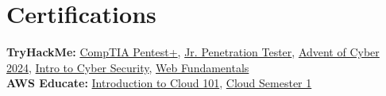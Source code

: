 \documentclass[10pt,a4paper]{article}
\begin{document}
\section{Certifications}
\small
\textbf{TryHackMe:}
\href{https://tryhackme-certificates.s3-eu-west-1.amazonaws.com/THM-9YN8F6SLAJ.pdf}{\textcolor{accent}{CompTIA Pentest+}},
\href{https://tryhackme-certificates.s3-eu-west-1.amazonaws.com/THM-EVC7DTCYWJ.pdf}{\textcolor{accent}{Jr. Penetration Tester}},
\href{https://tryhackme-certificates.s3-eu-west-1.amazonaws.com/THM-KCYOBBMWKV.pdf}{\textcolor{accent}{Advent of Cyber 2024}},
\href{https://tryhackme-certificates.s3-eu-west-1.amazonaws.com/THM-VDDWDT8NWY.pdf}{\textcolor{accent}{Intro to Cyber Security}},
\href{https://tryhackme-certificates.s3-eu-west-1.amazonaws.com/THM-NLQ4QFBFJZ.pdf}{\textcolor{accent}{Web Fundamentals}} \\[3pt]
\textbf{AWS Educate:}
\href{https://www.credly.com/badges/d6837af8-9e13-47fc-b375-928fe63768f2/public_url}{\textcolor{accent}{Introduction to Cloud 101}},
\href{https://www.credly.com/badges/5c61ac7a-62f5-4728-954e-5d3fc481cc9b/public_url}{\textcolor{accent}{Cloud Semester 1}}

\end{document}

